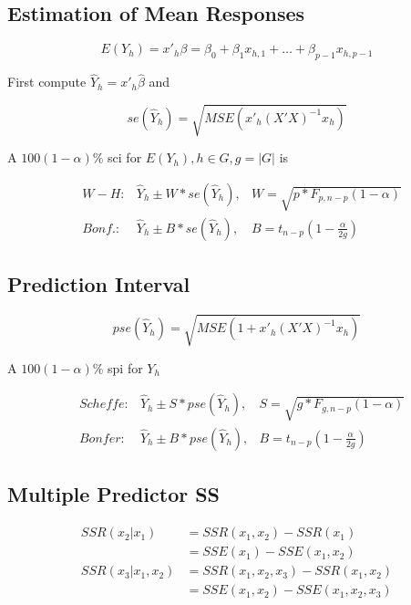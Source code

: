\documentclass[10pt]{article}
\begin{document}
\begin{multicols}{3}
    \subsection{Estimation of Mean Responses}

    \begin{equation}
        E(Y_h) = x'_h \beta = \beta_0 + \beta_1 x_{h,1} + \dots + \beta_{p - 1} x_{h, p-1}
    \end{equation}

    First compute $\hat Y_h = x'_h \hat\beta$ and

    \begin{equation}
        se(\hat Y_h) = \sqrt{MSE( x'_h (X'X)^{-1} x_h )}
    \end{equation}

    A $100(1 - \alpha)\%$ sci for $E(Y_h), h \in G, g = |G|$ is

    \begin{align}
         & W-H:   & \hat Y_h \pm W * se(\hat Y_h), & W = \sqrt{p * F_{p,n-p} (1-\alpha) }             \\
         & Bonf.: & \hat Y_h \pm B * se(\hat Y_h), & B = t_{n - p} \left(1 - \frac{\alpha}{2g}\right)
    \end{align}

    \subsection{Prediction Interval}

    \begin{equation}
        pse(\hat Y_h) = \sqrt{MSE (1 + x'_h (X'X)^{-1} x_h)}
    \end{equation}

    A $100(1 - \alpha)\%$ spi for $Y_h$

    \begin{align}
         & Scheffe: & \hat Y_h \pm S*pse(\hat Y_h), & S = \sqrt{g*F_{g,n-p} (1 - \alpha)}            \\
         & Bonfer:  & \hat Y_h \pm B*pse(\hat Y_h), & B = t_{n-p} \left(1 - \frac{\alpha}{2g}\right)
    \end{align}

    \subsection{Multiple Predictor SS}

    \begin{align*}
        SSR(x_2 | x_1)      & = SSR(x_1, x_2) - SSR(x_1)           \\
                            & = SSE(x_1) - SSE(x_1, x_2)           \\
        SSR(x_3 | x_1, x_2) & = SSR(x_1, x_2, x_3) - SSR(x_1, x_2) \\
                            & = SSE(x_1, x_2) - SSE(x_1, x_2, x_3)
    \end{align*}


\end{multicols}
\end{document}
